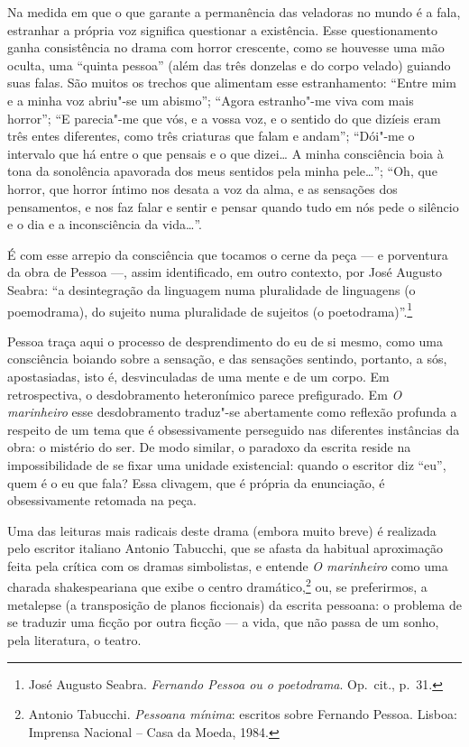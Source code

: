 Na medida em que o que garante a 
permanência das veladoras no mundo é a
fala, estranhar a própria voz significa
questionar a existência. Esse
questionamento ganha consistência no
drama com horror crescente, como
se houvesse uma mão oculta, uma “quinta pessoa”
(além das três donzelas
e do corpo velado) guiando suas falas. 
São muitos os trechos que
alimentam esse estranhamento: 
“Entre mim e a minha voz abriu"-se um
abismo”; “Agora estranho"-me viva com
mais horror”; “E parecia"-me que
vós, e a vossa voz, e o sentido do que 
dizíeis eram três entes
diferentes, como três criaturas que
falam e andam”; “Dói"-me o intervalo
que há entre o que pensais e o que
dizei\ldots{} A minha consciência boia à
tona da sonolência apavorada dos meus 
sentidos pela minha pele\ldots{}”;
“Oh, que horror, que horror íntimo nos desata a voz da alma, e as
sensações dos pensamentos, e nos
faz falar e sentir e pensar quando
tudo em nós pede o silêncio e o dia
e a inconsciência da vida\ldots{}”. 

É com esse arrepio da consciência que tocamos 
o cerne da peça --- e
porventura da obra de Pessoa ---, assim 
identificado, em outro contexto,
por José Augusto Seabra: “a desintegração
da linguagem numa pluralidade
de linguagens (o poemodrama), do sujeito
numa pluralidade de sujeitos
(o poetodrama)”.\footnote{ 
José Augusto Seabra. \textit{Fernando Pessoa
ou o poetodrama}. Op.~cit., p.~31.} 

Pessoa traça aqui o processo de desprendimento do eu de si mesmo, como
uma consciência boiando sobre a sensação, e das sensações sentindo,
portanto, a sós, apostasiadas, isto é, desvinculadas de uma mente e de
um corpo. Em retrospectiva, o desdobramento heteronímico parece
prefigurado. Em \textit{O marinheiro} esse desdobramento traduz"-se
abertamente como reflexão profunda a respeito de um tema que é
obsessivamente perseguido nas diferentes instâncias da obra: o mistério
do ser. De modo similar, o paradoxo da escrita reside na
impossibilidade de se fixar uma unidade existencial: quando o escritor
diz “eu”, quem é o eu que fala? Essa clivagem, que é própria da
enunciação, é obsessivamente retomada na peça.

Uma das leituras mais radicais deste drama (embora muito breve) é
realizada pelo escritor italiano Antonio Tabucchi, que se afasta da
habitual aproximação feita pela crítica com os dramas simbolistas, e
entende \textit{O marinheiro} como uma charada shakespeariana que exibe
o centro dramático,\footnote{ Antonio Tabucchi. \textit{Pessoana
mínima}: escritos sobre Fernando Pessoa. Lisboa: Imprensa Nacional --
Casa da Moeda, 1984.} ou, se preferirmos, a metalepse (a transposição
de planos ficcionais) da escrita pessoana: o problema de se traduzir
uma ficção por outra ficção --- a vida, que não passa de um sonho, pela
literatura, o teatro. 

